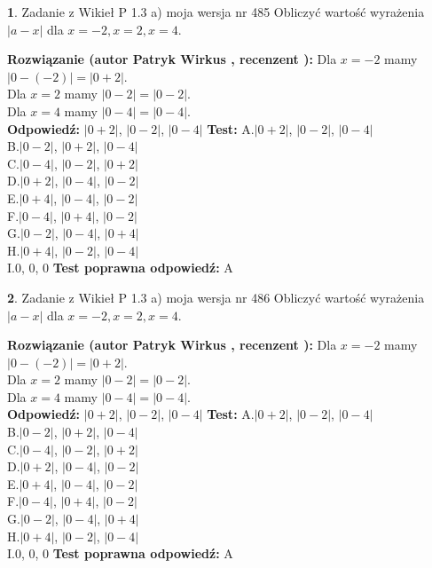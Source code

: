 \documentclass[12pt, a4paper]{article}
\theoremstyle{definition} %
\newtheorem{zad}{}
\newcommand{\zadStart}[1]{\begin{zad}#1\newline}
\newcommand{\zadStop}{\end{zad}}
\newcommand{\rozwStart}[2]{\noindent \textbf{Rozwiązanie (autor #1 , recenzent #2): }\newline}
\newcommand{\rozwStop}{\newline}
\newcommand{\odpStart}{\noindent \textbf{Odpowiedź:}\newline}
\newcommand{\odpStop}{\newline}
\newcommand{\testStart}{\noindent \textbf{Test:}\newline}
\newcommand{\testStop}{\newline}
\newcommand{\kluczStart}{\noindent \textbf{Test poprawna odpowiedź:}\newline}
\newcommand{\kluczStop}{\newline}
\begin{document}
\zadStart{Zadanie z Wikieł P 1.3 a) moja wersja nr 485}
Obliczyć wartość wyrażenia $|a - x|$ dla $x=-2,x=2,x=4$.
\zadStop
\rozwStart{Patryk Wirkus}{}
Dla $x = -2$ mamy $|0 - (-2)| = |0 + 2|$.\\
Dla $x = 2$ mamy $|0 - 2| = |0 - 2|$.\\
Dla $x = 4$ mamy $|0 - 4| = |0 - 4|$.\\
\rozwStop
\odpStart
$|0 + 2|$, $|0 - 2|$, $|0 - 4|$
\odpStop
\testStart
A.$|0 + 2|$, $|0 - 2|$, $|0 - 4|$\\
B.$|0 - 2|$, $|0 + 2|$, $|0 - 4|$\\
C.$|0 - 4|$, $|0 - 2|$, $|0 + 2|$\\
D.$|0 + 2|$, $|0 - 4|$, $|0 - 2|$\\
E.$|0 + 4|$, $|0 - 4|$, $|0 - 2|$\\
F.$|0 - 4|$, $|0 + 4|$, $|0 - 2|$\\
G.$|0 - 2|$, $|0 - 4|$, $|0 + 4|$\\
H.$|0 + 4|$, $|0 - 2|$, $|0 - 4|$\\
I.$0$, $0$, $0$
\testStop
\kluczStart
A
\kluczStop



\zadStart{Zadanie z Wikieł P 1.3 a) moja wersja nr 486}
Obliczyć wartość wyrażenia $|a - x|$ dla $x=-2,x=2,x=4$.
\zadStop
\rozwStart{Patryk Wirkus}{}
Dla $x = -2$ mamy $|0 - (-2)| = |0 + 2|$.\\
Dla $x = 2$ mamy $|0 - 2| = |0 - 2|$.\\
Dla $x = 4$ mamy $|0 - 4| = |0 - 4|$.\\
\rozwStop
\odpStart
$|0 + 2|$, $|0 - 2|$, $|0 - 4|$
\odpStop
\testStart
A.$|0 + 2|$, $|0 - 2|$, $|0 - 4|$\\
B.$|0 - 2|$, $|0 + 2|$, $|0 - 4|$\\
C.$|0 - 4|$, $|0 - 2|$, $|0 + 2|$\\
D.$|0 + 2|$, $|0 - 4|$, $|0 - 2|$\\
E.$|0 + 4|$, $|0 - 4|$, $|0 - 2|$\\
F.$|0 - 4|$, $|0 + 4|$, $|0 - 2|$\\
G.$|0 - 2|$, $|0 - 4|$, $|0 + 4|$\\
H.$|0 + 4|$, $|0 - 2|$, $|0 - 4|$\\
I.$0$, $0$, $0$
\testStop
\kluczStart
A
\kluczStop
\end{document}
